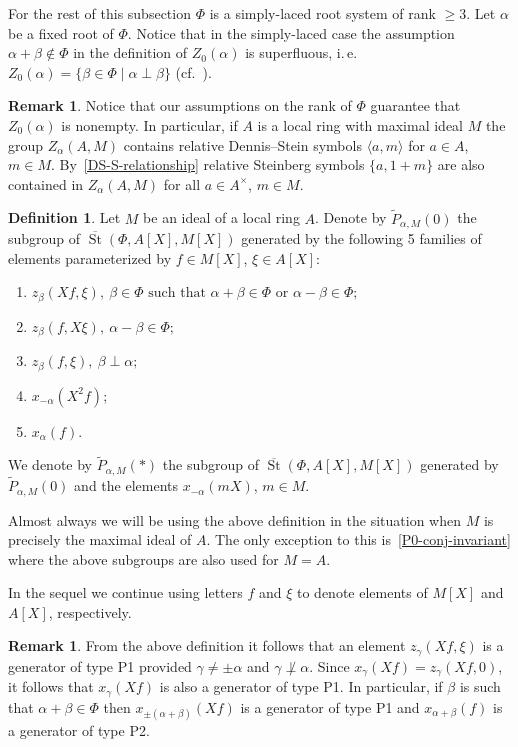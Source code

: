 \documentclass[oneside, 8pt]{amsart}
\theoremstyle{remark}
\theoremstyle{definition}
\numberwithin{lemma}{section}
\numberwithin{prop}{section}
\numberwithin{corollary}{section}
\numberwithin{externaltheorem}{section}
\newtheorem{df}[lemma]{Definition} \Crefname{df}{Definition}{Definitions}
\newtheorem{rem}[lemma]{Remark}
\DeclareMathOperator{\St}{St}
\numberwithin{equation}{section}
\begin{document}
For the rest of this subsection $\Phi$ is a simply-laced root system of rank $\geq 3$.
Let $\alpha$ be a fixed root of $\Phi$. 
Notice that in the simply-laced case the assumption $\alpha+\beta\not\in \Phi$ in the definition of $Z_0(\alpha)$ is superfluous, i.\,e. $Z_0(\alpha) = \{ \beta\in\Phi \mid \alpha \perp \beta \}$
(cf.~\cite[Proposition~5.7]{St71}).

\begin{rem}\label{Z-DS} Notice that our assumptions on the rank of $\Phi$ guarantee that $Z_0(\alpha)$ is nonempty. In particular, if $A$ is a local ring with maximal ideal $M$ the group $Z_\alpha(A, M)$ contains relative Dennis--Stein symbols $\langle a, m \rangle$ for $a\in A$, $m\in M$.
By~\eqref{DS-S-relationship} relative Steinberg symbols $\{a, 1+m\}$ are also contained in $Z_\alpha(A, M)$ for all $a\in A^\times$, $m\in M$. \end{rem}

\begin{df}\label{defP0}
Let $M$ be an ideal of a local ring $A$. Denote by $\widetilde{P}_{\alpha, M}(0)$ the subgroup of $\overline{\St}(\Phi, A[X], M[X])$ generated by the following 5 families of elements parameterized by $f \in M[X]$, $\xi \in A[X]$:
\begin{enumerate}[label=(P\arabic*)]
 \item $z_{\beta}(Xf, \xi),\ \beta \in \Phi \text{ such that }\alpha + \beta \in \Phi\text{ or } \alpha - \beta \in \Phi;$
 \item $z_{\beta}(f, X\xi),\ \alpha - \beta \in \Phi;$
 \item $z_{\beta}(f, \xi),\ \beta \perp \alpha;$
 \item $x_{-\alpha}(X^2f)$;
 \item $x_{\alpha}(f)$. \end{enumerate}

We denote by $\widetilde{P}_{\alpha, M}(*)$ the subgroup of $\overline{\St}(\Phi, A[X], M[X])$ generated by $\widetilde{P}_{\alpha, M}(0)$ and the elements $x_{-\alpha}(mX)$, $m \in M$.
\end{df}
Almost always we will be using the above definition in the situation when $M$ is precisely the maximal ideal of $A$. The only exception to this is~\cref{P0-conj-invariant} where the above subgroups are also used for $M=A$.

In the sequel we continue using letters $f$ and $\xi$ to denote elements of $M[X]$ and $A[X]$, respectively.

\begin{rem} \label{rem:recognition} From the above definition it follows that an element $z_\gamma(Xf, \xi)$ is a generator of type P1 provided $\gamma\neq\pm\alpha$ and $\gamma \not \perp \alpha$. Since $x_\gamma(Xf) = z_\gamma(Xf, 0)$, it follows that $x_{\gamma}(Xf)$ is also a generator of type P1. In particular, if $\beta$ is such that $\alpha + \beta \in \Phi$ then $x_{\pm(\alpha+\beta)}(Xf)$ is a generator of type P1 and $x_{\alpha+\beta}(f)$ is a generator of type P2. \end{rem}
\end{document}

